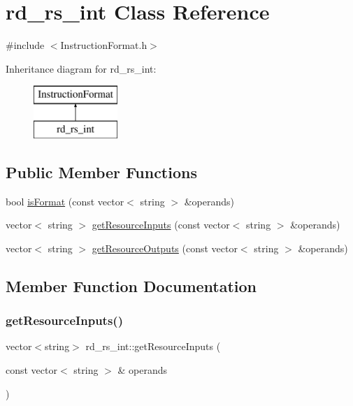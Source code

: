 \hypertarget{classrd__rs__int}{}\section{rd\+\_\+rs\+\_\+int Class Reference}
\label{classrd__rs__int}


{\ttfamily \#include $<$Instruction\+Format.\+h$>$}

Inheritance diagram for rd\+\_\+rs\+\_\+int\+:\begin{figure}[H]
\begin{center}
\leavevmode
\includegraphics[height=2.000000cm]{classrd__rs__int}
\end{center}
\end{figure}
\subsection*{Public Member Functions}
\begin{DoxyCompactItemize}
\item 
bool \hyperlink{classrd__rs__int_a0950cf3d4598c079cf88117d41fab7ea}{is\+Format} (const vector$<$ string $>$ \&operands)
\item 
vector$<$ string $>$ \hyperlink{classrd__rs__int_a8774c36cc600b25365a1616f4fb5f94b}{get\+Resource\+Inputs} (const vector$<$ string $>$ \&operands)
\item 
vector$<$ string $>$ \hyperlink{classrd__rs__int_a48f2b5901a9a74c1cad322fa4bd50f65}{get\+Resource\+Outputs} (const vector$<$ string $>$ \&operands)
\end{DoxyCompactItemize}


\subsection{Member Function Documentation}
\mbox{\label{classrd__rs__int_a8774c36cc600b25365a1616f4fb5f94b}} 
\subsubsection{\texorpdfstring{get\+Resource\+Inputs()}{getResourceInputs()}}
{\footnotesize\ttfamily vector$<$string$>$ rd\+\_\+rs\+\_\+int\+::get\+Resource\+Inputs (\begin{DoxyParamCaption}\item[{const vector$<$ string $>$ \&}]{operands }\end{DoxyParamCaption})\hspace{0.3cm}{\ttfamily [virtual]}}

